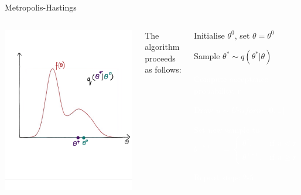 \documentclass[compress]{beamer}
\begin{document}
\begin{frame}[label=sec-7-3]{Metropolis-Hastings}
\begin{columns}[c] 
\includegraphics[width=1\linewidth]{MH2}

The algorithm proceeds as follows:
\begin{enumerate}
\item Initialise $\theta^{0}$, set $\theta = \theta^{0}$
\item Sample $\theta^* \sim q(\theta^*|\theta)$
\textcolor{white}{
\item[\color{white}] Compute acceptance probability, r
\item[\color{white}] Draw $u \sim Uniform[0,1]$
\item[\color{white}] Set new sample to 
\[
 \theta^{(s+1)} = 
\begin{cases}
    \theta^*, & \text{if } u < r\\
    \theta^{(s)}, & \text{if } u \geqslant r
\end{cases}
\]
\item[\color{white}] Repeat steps 2-5
}
\end{enumerate}
\end{columns}
\end{frame}
\end{document}

